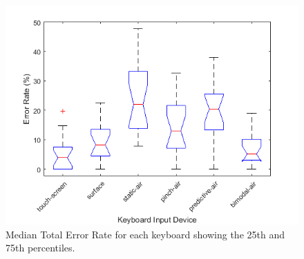 \begin{figure}[t]
	\centering
	\includegraphics{Figures/fig_totER_boxplot}
	\caption[Total Error Rate Boxplot]{Median Total Error Rate for each keyboard showing the 25th and 75th percentiles.}
	\label{fig_totER_boxplot}
\end{figure}

